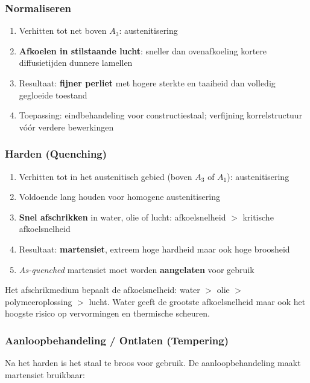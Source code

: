 \subsubsection{Normaliseren}

\begin{enumerate}
    \item Verhitten tot net boven $A_3$: austenitisering
    \item \textbf{Afkoelen in stilstaande lucht}: sneller dan ovenafkoeling \textrightarrow{} kortere diffusietijden \textrightarrow{} dunnere lamellen
    \item Resultaat: \textbf{fijner perliet} met hogere sterkte en taaiheid dan volledig gegloeide toestand
    \item Toepassing: eindbehandeling voor constructiestaal; verfijning korrelstructuur vóór verdere bewerkingen
\end{enumerate}

\subsubsection{Harden (Quenching)}

\begin{enumerate}
    \item Verhitten tot in het austenitisch gebied (boven $A_3$ of $A_1$): austenitisering
    \item Voldoende lang houden voor homogene austenitisering
    \item \textbf{Snel afschrikken} in water, olie of lucht: afkoelsnelheid $>$ kritische afkoelsnelheid
    \item Resultaat: \textbf{martensiet}, extreem hoge hardheid maar ook hoge broosheid
    \item \emph{As-quenched} martensiet moet worden \textbf{aangelaten} voor gebruik
\end{enumerate}

Het afschrikmedium bepaalt de afkoelsnelheid: water $>$ olie $>$ polymeeroplossing $>$ lucht. Water geeft de grootste afkoelsnelheid maar ook het hoogste risico op vervormingen en thermische scheuren.

\subsubsection{Aanloopbehandeling / Ontlaten (Tempering)}

Na het harden is het staal te broos voor gebruik. De aanloopbehandeling maakt martensiet bruikbaar:

